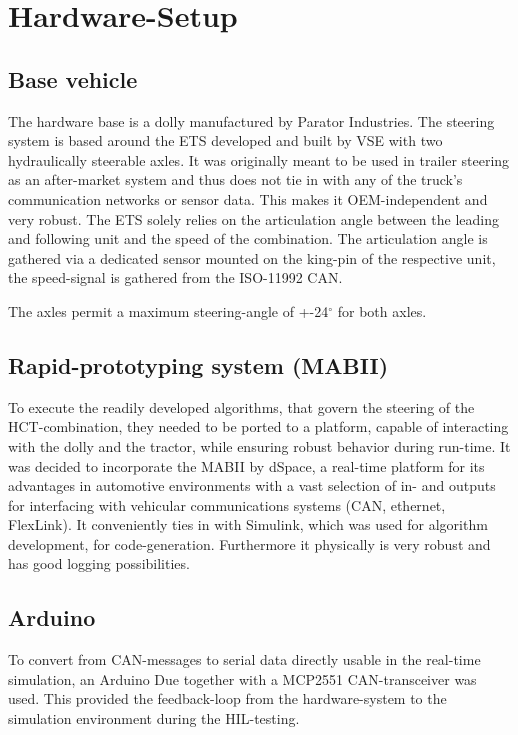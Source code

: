 \documentclass[root.tex]{subfiles}
\begin{document}
{\pagestyle{empty}}
\section{Hardware-Setup}
\label{chap:Hardware-Setup}
\subsection{Base vehicle}
\label{sec:basevehicle}

The hardware base is a dolly manufactured by Parator Industries. The steering system is based around the \gls{ETS} developed and built by \gls{VSE} with two hydraulically steerable axles. It was originally meant to be used in trailer steering as an after-market system and thus does not tie in with any of the truck's communication networks or sensor data. This makes it OEM-independent and very robust. The \gls{ETS} solely relies on the articulation angle between the leading and following unit and the speed of the combination. The articulation angle is gathered via a dedicated sensor mounted on the king-pin of the respective unit, the speed-signal is gathered from the ISO-11992 \gls{CAN}. 

The axles permit a maximum steering-angle of +-24$^\circ$ for both axles. 
\subsection{Rapid-prototyping system (\gls{MABII})}

To execute the readily developed algorithms\cite{c27}, that govern the steering of the \gls{HCT}-combination, they needed to be ported to a platform, capable of interacting with the dolly and the tractor, while ensuring robust behavior during run-time. It was decided to incorporate the \gls{MABII} by dSpace, a real-time platform for its advantages in automotive environments with a vast selection of in- and outputs for interfacing with vehicular communications systems (\gls{CAN}, ethernet, FlexLink). It conveniently ties in with Simulink, which was used for algorithm development, for code-generation. Furthermore it physically is very robust and has good logging possibilities.


\subsection{Arduino}

To convert from \gls{CAN}-messages to serial data directly usable in the real-time simulation, an Arduino Due together with a MCP2551 \gls{CAN}-transceiver was used. This provided the feedback-loop from the hardware-system to the simulation environment during the \gls{HIL}-testing. 
\end{document}
